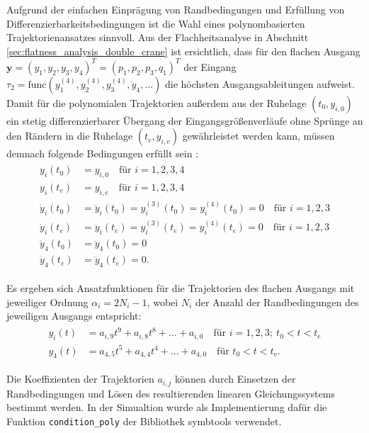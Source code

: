 Aufgrund der einfachen Einprägung von Randbedingungen und Erfüllung von Differenzierbarkeitsbedingungen ist die Wahl eines polynombasierten Trajektorienansatzes sinnvoll. Aus der Flachheitsanalyse in Abschnitt \ref{sec:flatness_analysis_double_crane} ist ersichtlich, dass für den flachen Ausgang ${\mathbf{y} = (y_1, y_2, y_3, y_4)^T = (p_1, p_2, p_3, q_1)^T}$ der Eingang $\tau_2 = \mathrm{func}(y_1^{(4)}, y_2^{(4)}, y_3^{(4)}, \ddot{y}_4, ...)$ die höchsten Ausgangsableitungen aufweist. Damit für die polynomialen Trajektorien außerdem aus der Ruhelage $(t_0, y_{i, 0})$  ein stetig differenzierbarer Übergang der Eingangsgrößenverläufe ohne Sprünge an den Rändern in die Ruhelage $(t_e, y_{i, e})$ gewährleistet werden kann, müssen demnach folgende Bedingungen erfüllt sein \cite[S. 230]{NLRT_Roebenack}:
\begin{align}
	\begin{split}
	y_i(t_0) &= y_{i, 0}  \quad \text{für } i = 1,2,3,4 \\
	y_i(t_e) &= y_{i, e}  \quad \text{für } i = 1,2,3,4 \\
	\dot{y}_i(t_0) &= \ddot{y}_i(t_0) = y_i^{(3)}(t_0) = y_i^{(4)}(t_0) = 0 \quad \text{für } i = 1,2,3 \\
	\dot{y}_i(t_e) &= \ddot{y}_i(t_e) = y_i^{(3)}(t_e) = y_i^{(4)}(t_e) = 0 \quad \text{für } i = 1,2,3 \\
	\dot{y}_4(t_0) &= \ddot{y}_4(t_0) = 0 \\
	\dot{y}_4(t_e) &= \ddot{y}_4(t_e) = 0.
	\end{split}
\end{align}

Es ergeben sich Ansatzfunktionen für die Trajektorien des flachen Ausgangs mit jeweiliger Ordnung $\alpha_i = 2 N_i - 1$, wobei $N_i$ der Anzahl der Randbedingungen des jeweiligen Ausgangs entspricht:
\begin{align}
	\label{eq:polynomes_ref_trajectories}
	\begin{split}
	y_i(t) &= a_{i, 9} t^9 + a_{i, 8} t^8 + ... + a_{i, 0} \quad \text{für }  i = 1,2,3; \ t_0 < t < t_e \\
	y_4(t) &= a_{4, 5} t^5 + a_{4, 4} t^4 + ... + a_{4, 0} \quad \text{für } t_0 < t < t_e.
	\end{split}
\end{align}

Die Koeffizienten der Trajektorien $a_{i, j}$ können durch Einsetzen der Randbedingungen und Lösen des resultierenden linearen Gleichungssystems bestimmt werden. In der Simualtion wurde als Implementierung dafür die Funktion \texttt{condition\_poly} der Bibliothek symbtools verwendet.


